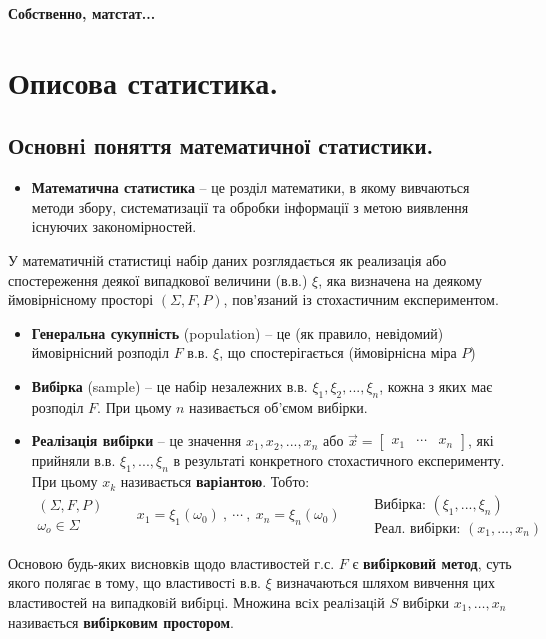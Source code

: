 \def\red#1{\textbf{\color{javared}#1}}
\def\blue#1{\textbf{\color{javadocblue}#1}}
\def\card{\text{card}}

\begin{center}
	\Huge \textbf{Собственно, матстат...}
\end{center}
\section{Описова статистика.}
\subsection{Основнi поняття математичної статистики.}
 \begin{itemize}
 \item\textbf{\color{javared} Математична статистика} -- це розділ математики, в якому вивчаються методи збору, систематизації та обробки інформації з метою виявлення існуючих закономірностей.
   \end{itemize}
     У математичній статистиці набір даних розглядається як реализація або спостереження деякої випадкової величини (в.в.) $\xi$, яка визначена на деякому ймовірнісному просторі $\left( \Sigma, F, P \right)$, пов'язаний із стохастичним експериментом.
   \begin{itemize}
     \item \textbf{\color{javared} Генеральна сукупність} (population) --  це (як правило, невідомий) ймовірнісний розподіл $F$ в.в. $\xi$, що спостерігається (ймовірнісна міра $P$)
     \item \textbf{\color{javared} Вибірка} (sample) -- це набір незалежних в.в. $\xi_1, \xi_2 ,..., \xi_n$, кожна з яких має розподіл $F$. При цьому $n$ називається об'ємом вибірки.
     \item \textbf{\color{javared} Реалізація вибірки} -- це значення $x_1 , x_2 , ... , x_n$ або $\overrightarrow{x} = \begin{bmatrix}
      x_1 & \cdots & x_n
     \end{bmatrix}$, які прийняли в.в. $\xi_1 , ... , \xi_n$ в результаті конкретного стохастичного експерименту. При цьому $x_k$ називається \textbf{\color{javadocblue} варiантою}. Тобто:
     $$
     \begin{gathered}
      \left( \Sigma , F, P \right)\\
      \omega_o \in \Sigma
     \end{gathered} \qquad x_1 = \xi_1(\omega_0)\ , \ \cdots \ , \  x_n  = \xi_n (\omega_0) \qquad \begin{array}{r}
      \text{Вибірка: } (\xi_1 , ..., \xi_n) \\
      \text{Реал. вибірки: } (x_1 , ... , x_n)
     \end{array}
     $$
 \end{itemize}
Основою будь-яких висновкiв щодо властивостей г.с. $F$ є \textbf{\color{javadocblue} вибiрковий метод}, суть якого полягає в тому, що властивостi в.в. $\xi$
визначаються шляхом вивчення цих властивостей
на випадковiй вибiрцi. Множина всiх реалiзацiй $S$ вибiрки $x_1 , \dots , x_n$ називається \textbf{\color{javadocblue} вибiрковим простором}.

